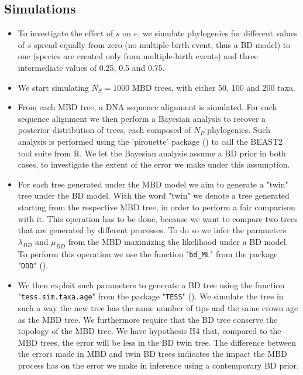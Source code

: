 \documentclass{article}
\begin{document}
\subsection{Simulations}
\begin{itemize}

\item To investigate the effect of $s$ on $e$, we simulate phylogenies
for different values of $s$ spread equally from zero (no multiple-birth
event, thus a BD model) to one (species are created only from multiple-birth
events) and three intermediate values of 0.25, 0.5 and 0.75.

\item We start simulating $N_{S} = 1000$ MBD trees,
with either 50, 100 and 200 taxa.

\item From each MBD tree, a DNA sequence alignment is simulated. 
For each sequence alignment we then perform a Bayesian analysis 
to recover a posterior distribution of trees, 
each composed of $N_{P}$ phylogenies. 
Such analysis is performed using 
the 'pirouette' package (\cite{pirouette}) to call the BEAST2 tool 
suite from R. 
We let the Bayesian analysis assume a BD prior in both cases, 
to investigate the extent of the error we make under this assumption.

\item For each tree generated under the MBD model 
we aim to generate a "twin" tree under the BD model. 
With the word "twin" 
we denote a tree generated starting from the respective MBD tree, 
in order to perform a fair comparison with it. 
This operation has to be done, 
because we want to compare two trees 
that are generated by different processes. 
To do so we infer the parameters $\lambda_{BD}$ and $\mu_{BD}$ 
from the MBD maximizing the likelihood under a BD model. 
To perform this operation we use the function "\texttt{bd\_ML}" 
from the package "\texttt{DDD}" (\cite{etienne2012diversity}). 

\item We then exploit such parameters to generate a BD tree 
using the function "\texttt{tess.sim.taxa.age}" 
from the package "\texttt{TESS}" (\cite{Hoehna2013}). 
We simulate the tree in such a way the new tree 
has the same number of tips and the same crown age as the MBD tree. 
We furthermore require that the BD tree conserve the topology of the MBD tree.
We have hypothesis H4 that, compared to the MBD trees, 
the error will be less in the BD twin tree.
The difference between the errors made in MBD and twin BD trees indicates
the impact the MBD process has on the error we make in inference using a
contemporary BD prior.


\end{itemize}
\end{document}
